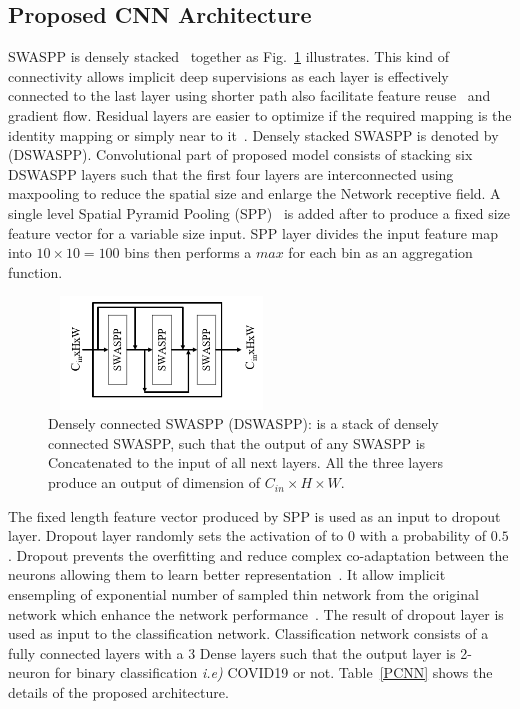 \subsection{Proposed CNN Architecture}
SWASPP is densely stacked~\cite{huang2017densely} together as Fig.~\ref{denseB} illustrates. This kind of connectivity allows implicit deep supervisions as each layer is effectively connected to the last layer using shorter path also facilitate feature reuse~\cite{huang2017densely} and gradient flow. Residual layers are easier to optimize if the required mapping is the identity mapping or simply near to it~\cite{he2016deep}. Densely stacked SWASPP is denoted by (DSWASPP). Convolutional part of proposed model consists of stacking six DSWASPP layers such that the first four layers are interconnected using maxpooling to reduce the spatial size and enlarge the Network receptive field. A single level Spatial Pyramid Pooling (SPP)~\cite{he2015spatial} is added after to produce a fixed size feature vector for a variable size input. SPP layer divides the input feature map into $10\times 10 = 100$ bins then performs a $max$ for each bin as an aggregation function. 
\begin{center}
\begin{figure}[htbp]
\centerline{\includegraphics[height=30mm,width=6cm]{Figures/DensResd.PNG}}
\caption{Densely connected SWASPP (DSWASPP): is a stack of densely connected SWASPP, such that the output of any SWASPP is Concatenated to the input of all next layers. All the three layers produce an output of dimension of $C_{in} \times H \times W$.}
\label{denseB}
\end{figure}
\end{center}

The fixed length feature vector produced by SPP is used as an input to dropout~\cite{srivastava2014dropout} layer. Dropout layer randomly sets the activation of to $0$ with a probability of $0.5$. Dropout prevents the overfitting and reduce complex co-adaptation between the neurons allowing them to learn better representation~\cite{srivastava2014dropout}. It allow implicit ensempling of exponential number of sampled thin network from the original network which enhance the network performance~\cite{srivastava2014dropout}. The result of dropout layer is used as input to the classification network. Classification network consists of a fully connected layers with a $3$ Dense layers such that the output layer is 2-neuron for binary classification \textit{i.e)} COVID19 or not. Table~\ref{PCNN} shows the details of the proposed architecture.

